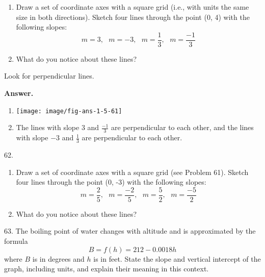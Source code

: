 \documentclass[10pt,]{book}
\theoremstyle{plain}
\theoremstyle{definition}
\theoremstyle{definition}
\theoremstyle{definition}
\theoremstyle{definition}
\numberwithin{equation}{part}
\begin{document}
\begin{exerciselist}
\begin{enumerate}[label=*\alph**]
\item\hypertarget{li-1277}{}Draw a set of coordinate axes with a square grid (i.e., with units the same size in both directions). Sketch four lines through the point (0, 4) with the following slopes:%
\begin{equation*}
m = 3, ~~~ m = -3,~~~ m = \frac{1}{3}, ~~~ m =\frac{-1}{3}
\end{equation*}
%
\item\hypertarget{li-1278}{}What do you notice about these lines?%
\end{enumerate}
%
Look for perpendicular lines.%
\par\smallskip
\par\smallskip
\noindent\textbf{Answer.}\hypertarget{answer-194}{}\quad
\leavevmode%
\begin{multicols}{2}
\begin{enumerate}[label=*\alph**]
\item\hypertarget{li-1279}{}\texttt{[image: image/fig-ans-1-5-61]}
%
\item\hypertarget{li-1280}{}The lines with slope \(3\) and \(\frac{-1}{3}\) are perpendicular to each other, and the lines with slope \(-3\) and \(\frac{1}{3}\) are perpendicular to each other.%
\end{enumerate}
\end{multicols}
%
\item[62.]\hypertarget{exercise-348}{}\leavevmode%
\begin{enumerate}[label=*\alph**]
\item\hypertarget{li-1281}{}Draw a set of coordinate axes with a square grid (see Problem 61). Sketch four lines through the point (0, -3) with the following slopes:%
\begin{equation*}
m = \frac{2}{5}, ~~~ m = \frac{-2}{5},~~~ m = \frac{5}{2}, ~~~ m =\frac{-5}{2}
\end{equation*}
%
\item\hypertarget{li-1282}{}What do you notice about these lines?%
\end{enumerate}
%
\par\smallskip
\item[63.]\hypertarget{exercise-349}{}The boiling point of water changes with altitude and is approximated by the formula%
\begin{equation*}
B = f (h) = 212 - 0.0018h
\end{equation*}
where \(B\) is in degrees and \(h\) is in feet. State the slope and vertical intercept of the graph, including units, and explain their meaning in this context.%

\end{exerciselist}
\end{document}

